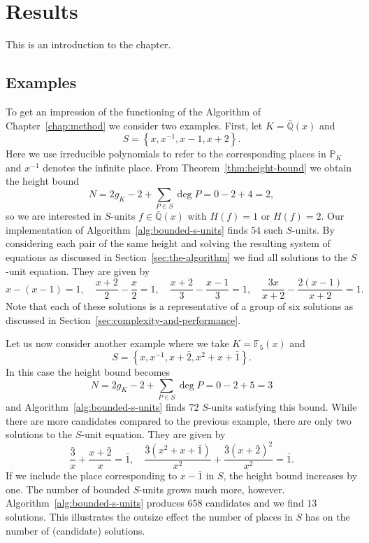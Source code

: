 
\chapter{Results}%
\label{chap:results}

This is an introduction to the chapter.

\section{Examples}%
\label{sec:examples}

To get an impression of the functioning of the Algorithm of Chapter~\ref{chap:method} we consider two examples. First, let \(K = \bar{\mathbb{Q}}(x)\) and
\[S = \left\{ x, x^{-1}, x - 1, x + 2 \right\}.\]
Here we use irreducible polynomials to refer to the corresponding places in \(\mathbb{P}_{K}\) and \(x^{-1}\) denotes the infinite place. From Theorem~\ref{thm:height-bound} we obtain the height bound
\[N = 2g_{K} - 2 + \sum_{P \in S} \deg{P} = 0 - 2 + 4 = 2,\]
so we are interested in \(S\)-units \(f \in \bar{\mathbb{Q}}(x)\) with \(H(f) = 1\) or \(H(f) = 2\). Our implementation of Algorithm~\ref{alg:bounded-s-units} finds \(54\) such \(S\)-units. By considering each pair of the same height and solving the resulting system of equations as discussed in Section~\ref{sec:the-algorithm} we find all solutions to the \(S\)-unit equation. They are given by
\[x - (x - 1) = 1, \quad \frac{x + 2}{2} - \frac{x}{2} = 1, \quad \frac{x + 2}{3} - \frac{x - 1}{3} = 1, \quad \frac{3x}{x + 2} - \frac{2(x - 1)}{x + 2} = 1.\]
Note that each of these solutions is a representative of a group of six solutions as discussed in Section~\ref{sec:complexity-and-performance}.

Let us now consider another example where we take \(K = \mathbb{F}_{5}(x)\) and
\[S = \left\{ x, x^{-1}, x + \bar{2}, x^{2} + x + \bar{1} \right\}.\]
In this case the height bound becomes
\[N = 2g_{K} - 2 + \sum_{P \in S} \deg{P} = 0 - 2 + 5 = 3\]
and Algorithm~\ref{alg:bounded-s-units} finds \(72\) \(S\)-units satisfying this bound. While there are more candidates compared to the previous example, there are only two solutions to the \(S\)-unit equation. They are given by
\[\frac{\bar{3}}{x}  + \frac{x + \bar{2}}{x} = \bar{1}, \quad \frac{\bar{3}(x^{2} + x + \bar{1})}{x^{2}} + \frac{\bar{3}{(x + \bar{2})}^{2}}{x^{2}} = \bar{1}.\]
If we include the place corresponding to \(x - \bar{1}\) in \(S\), the height bound increases by one. The number of bounded \(S\)-units grows much more, however. Algorithm~\ref{alg:bounded-s-units} produces \(658\) candidates and we find \(13\) solutions. This illustrates the outsize effect the number of places in \(S\) has on the number of (candidate) solutions.

